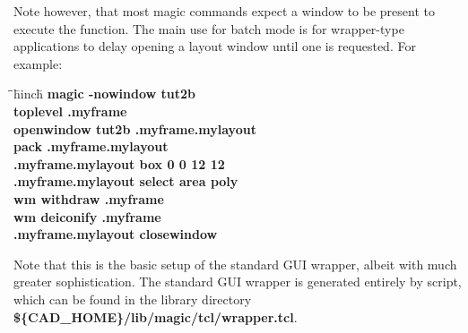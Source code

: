 \documentclass[letterpaper,twoside,12pt]{article}
\def\hinch{\hspace*{0.5in}}
\def\starti{\begin{center}\begin{tabbing}\hinch\=\hinch\=\hinch\=hinch\hinch\=\kill}
\def\endi{\end{tabbing}\end{center}}
\def\ii{\>\>\>}
\begin{document}
Note however, that most magic commands expect a window to be present to
execute the function.  The main use for batch mode is for wrapper-type
applications to delay opening a layout window until one is requested.
For example:
\starti
   \ii {\itshape \#} {\bfseries magic -nowindow tut2b} \\
   \ii {\itshape \%} {\bfseries toplevel .myframe} \\
   \ii {\itshape \%} {\bfseries openwindow tut2b .myframe.mylayout} \\
   \ii {\itshape \%} {\bfseries pack .myframe.mylayout} \\
   \ii {\itshape \%} {\bfseries .myframe.mylayout box 0 0 12 12} \\
   \ii {\itshape \%} {\bfseries .myframe.mylayout select area poly} \\
   \ii {\itshape \%} {\bfseries wm withdraw .myframe} \\
   \ii {\itshape \%} {\bfseries wm deiconify .myframe} \\
   \ii {\itshape \%} {\bfseries .myframe.mylayout closewindow} \\
\endi

Note that this is the basic setup of the standard GUI wrapper, albeit with
much greater sophistication.  The standard GUI wrapper is generated
entirely by script, which can be found in the library directory
{\bfseries \$\{CAD\_HOME\}/lib/magic/tcl/wrapper.tcl}.

\medskip
{} \\
\end{document}
